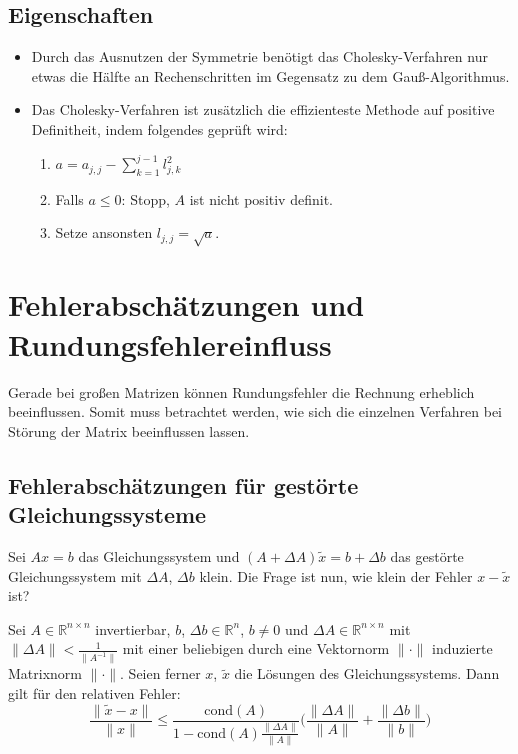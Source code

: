 \documentclass[a4paper, 11pt, accentcolor = tud3b]{tudreport}
\newcommand{\norm}[1]{\ensuremath{\lVert #1 \rVert}}
\newcommand{\R}{\ensuremath{\mathbb{R}}}
\newcommand{\cond}{\ensuremath{\textrm{cond}}}
\begin{document}
	        \subsection{Eigenschaften}
		        \begin{itemize}
		        	\item Durch das Ausnutzen der Symmetrie benötigt das Cholesky-Verfahren nur etwas die Hälfte an Rechenschritten im Gegensatz zu dem Gauß-Algorithmus.
		        	\item Das Cholesky-Verfahren ist zusätzlich die effizienteste Methode auf positive Definitheit, indem folgendes geprüft wird:
		        	\begin{enumerate}
		        		\item \( a = a_{j,j} - \sum_{k=1}^{j-1} l_{j,k}^2 \)
		        		\item Falls \( a \leq 0 \): Stopp, \(A\) ist nicht positiv definit.
		        		\item Setze ansonsten \( l_{j,j} = \sqrt{a} \).
		        	\end{enumerate}
		        \end{itemize}
	
	    \section{Fehlerabschätzungen und Rundungsfehlereinfluss}
	        Gerade bei großen Matrizen können Rundungsfehler die Rechnung erheblich beeinflussen. Somit muss betrachtet werden, wie sich die einzelnen Verfahren bei Störung der Matrix beeinflussen lassen.
	
	        \subsection{Fehlerabschätzungen für gestörte Gleichungssysteme}
	            Sei \( Ax = b \) das Gleichungssystem und \( (A + \Delta\!A)\tilde{x} = b + \Delta\!b \) das gestörte Gleichungssystem mit \( \Delta\!A \), \( \Delta\!b \) klein. Die Frage ist nun, wie klein der Fehler \( x - \tilde{x} \) ist?
	            
	            Sei \( A \in \R^{n \times n} \) invertierbar, \(b\), \(\Delta\!b \in \R^n\), \(b \neq 0\) und \(\Delta\!A \in \R^{n \times n}\) mit \( \norm{\Delta\!A} < \frac{1}{\norm{A^{-1}}} \) mit einer beliebigen durch eine Vektornorm \( \norm{\cdot} \) induzierte Matrixnorm \( \norm{\cdot} \). Seien ferner \(x\), \(\tilde{x}\) die Lösungen des Gleichungssystems. Dann gilt für den relativen Fehler:
	            \begin{equation*}
		            \frac{\norm{\tilde{x} - x}}{\norm{x}} \leq \frac{\cond(A)}{1 - \cond(A) \frac{\norm{\Delta\!A}}{\norm{A}}} \bigg( \frac{\norm{\Delta\!A}}{\norm{A}} + \frac{\norm{\Delta\!b}}{\norm{b}} \bigg)
	            \end{equation*}
	
\end{document}
